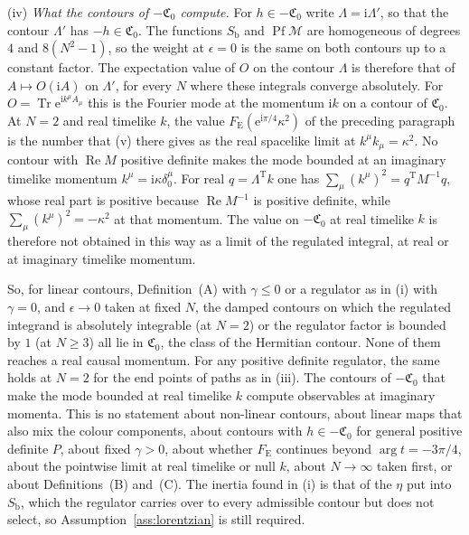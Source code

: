 (iv) \emph{What the contours of \(-\mathfrak C_0\) compute.} For \(h\in-\mathfrak C_0\) write \(\Lambda=\mathrm i\Lambda'\), so that the contour \(\Lambda'\) has \(-h\in\mathfrak C_0\). The functions \(S_{\mathrm b}\) and \(\operatorname{Pf}\mathcal M\) are homogeneous of degrees \(4\) and \(8(N^2-1)\), so the weight at \(\epsilon=0\) is the same on both contours up to a constant factor. The expectation value of \(O\) on the contour \(\Lambda\) is therefore that of \(A\mapsto O(\mathrm iA)\) on \(\Lambda'\), for every \(N\) where these integrals converge absolutely. For \(O=\operatorname{Tr}\mathrm e^{\mathrm ik^\mu A_\mu}\) this is the Fourier mode at the momentum \(\mathrm ik\) on a contour of \(\mathfrak C_0\). At \(N=2\) and real timelike \(k\), the value \(F_{\mathrm E}(\mathrm e^{\mathrm i\pi/4}\kappa^2)\) of the preceding paragraph is the number that (v) there gives as the real spacelike limit at \(k^\mu k_\mu=\kappa^2\). No contour with \(\operatorname{Re}M\) positive definite makes the mode bounded at an imaginary timelike momentum \(k^\mu=\mathrm i\kappa\delta^\mu_0\). For real \(q=\Lambda^{\mathrm T}k\) one has \(\sum_\mu(k^\mu)^2=q^{\mathrm T}M^{-1}q\), whose real part is positive because \(\operatorname{Re}M^{-1}\) is positive definite, while \(\sum_\mu(k^\mu)^2=-\kappa^2\) at that momentum. The value on \(-\mathfrak C_0\) at real timelike \(k\) is therefore not obtained in this way as a limit of the regulated integral, at real or at imaginary timelike momentum.

So, for linear contours, Definition~(A) with \(\gamma\le0\) or a regulator as in (i) with \(\gamma=0\), and \(\epsilon\to0\) taken at fixed \(N\), the damped contours on which the regulated integrand is absolutely integrable (at \(N=2\)) or the regulator factor is bounded by \(1\) (at \(N\ge3\)) all lie in \(\mathfrak C_0\), the class of the Hermitian contour. None of them reaches a real causal momentum. For any positive definite regulator, the same holds at \(N=2\) for the end points of paths as in (iii). The contours of \(-\mathfrak C_0\) that make the mode bounded at real timelike \(k\) compute observables at imaginary momenta. This is no statement about non-linear contours, about linear maps that also mix the colour components, about contours with \(h\in-\mathfrak C_0\) for general positive definite \(P\), about fixed \(\gamma>0\), about whether \(F_{\mathrm E}\) continues beyond \(\arg t=-3\pi/4\), about the pointwise limit at real timelike or null \(k\), about \(N\to\infty\) taken first, or about Definitions~(B) and~(C). The inertia found in (i) is that of the \(\eta\) put into \(S_{\mathrm b}\), which the regulator carries over to every admissible contour but does not select, so Assumption~\ref{ass:lorentzian} is still required.

